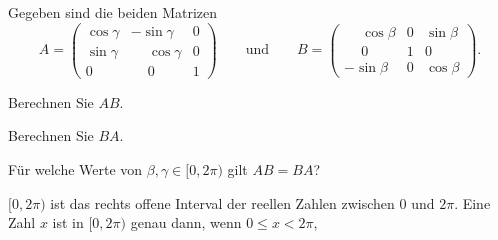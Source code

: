 Gegeben sind die beiden Matrizen
\[
A
=
\begin{pmatrix}
\cos\gamma&         - \sin\gamma&0\\
\sin\gamma&\phantom{-}\cos\gamma&0\\
    0     &\phantom{-}    0     &1
\end{pmatrix}
\qquad\text{und}\qquad
B
=
\begin{pmatrix}
\phantom{-}\cos\beta&0&\sin\beta\\
\phantom{-}    0    &1&    0    \\
         - \sin\beta&0&\cos\beta
\end{pmatrix}.
\]
\begin{teilaufgaben}
\item Berechnen Sie $AB$.
\item Berechnen Sie $BA$.
\item Für welche Werte von $\beta,\gamma\in[0,2\pi)$ gilt
$AB=BA$?
\end{teilaufgaben}

\begin{hinweis}
$[0,2\pi)$ ist das rechts offene Interval der reellen Zahlen zwischen 
$0$ und $2\pi$.
Eine Zahl $x$ ist in $[0,2\pi)$ genau dann,
wenn $0\le x<2\pi$,
\end{hinweis}

